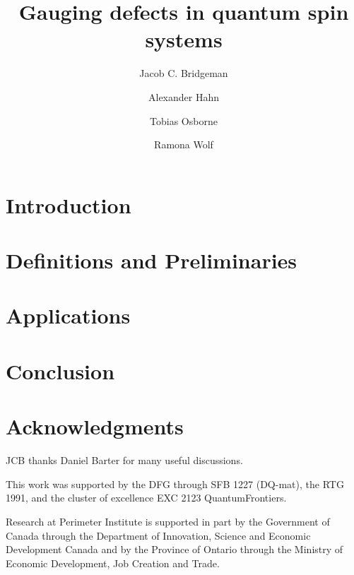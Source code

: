 

\title{Gauging defects in quantum spin systems}
\author{Jacob C. Bridgeman}
\author{Alexander Hahn}
\author{Tobias Osborne}
\author{Ramona Wolf}

\newcommand{\jcb}[1]{\textcolor{blue}{#1}}



\maketitle

\begin{abstract}
	
\end{abstract}

\section{Introduction}


\section{Definitions and Preliminaries}






\section{Applications}



\section{Conclusion}

\section*{Acknowledgments}
JCB thanks Daniel Barter for many useful discussions.

This work was supported by the DFG through SFB 1227 (DQ-mat), the RTG 1991, and the cluster of excellence EXC 2123 QuantumFrontiers.

Research at Perimeter Institute is supported in part by the Government of Canada through the Department of Innovation, Science and Economic Development Canada and by the Province of Ontario through the Ministry of Economic Development, Job Creation and Trade.



